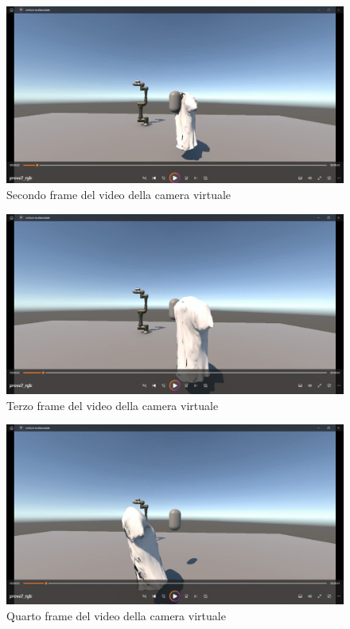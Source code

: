 \documentclass[11pt]{report}
\begin{document}
\begin{figure} [H]
    \centering
    \includegraphics[width=1\textwidth]{images/frame_video_2.PNG}
    \caption{Secondo frame del video della camera virtuale}
    \label{fig:frame_video_2}
\end{figure}

\begin{figure} [H]
    \centering
    \includegraphics[width=1\textwidth]{images/frame_video_3.PNG}
    \caption{Terzo frame del video della camera virtuale}
    \label{fig:frame_video_3}
\end{figure}

\begin{figure} [H]
    \centering
    \includegraphics[width=1\textwidth]{images/frame_video_4.PNG}
    \caption{Quarto frame del video della camera virtuale}
    \label{fig:frame_video_4}
\end{figure}
\end{document}
